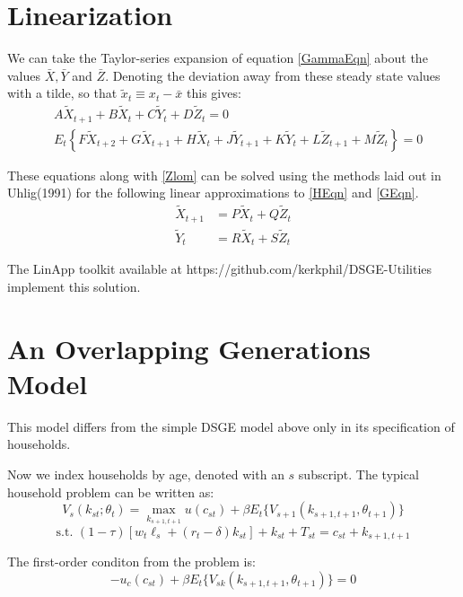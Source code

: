 \documentclass[letterpaper,12pt]{article}
\theoremstyle{definition}
\begin{document}
\begin{spacing}{1.5}
\section{Linearization}
	We can take the Taylor-series expansion of equation \eqref{GammaEqn} about the values $\bar X, \bar Y$ and $\bar Z$.  Denoting the deviation away from these steady state values with a tilde, so that $\tilde x_t \equiv x_t - \bar x$ this gives:
	\begin{align}
		& A \tilde X_{t+1} + B \tilde X_t + C \tilde Y_t + D \tilde Z_t = 0 \\
		& E_t\left\{ F \tilde X_{t+2} + G \tilde X_{t+1} + H \tilde X_{t} + J \tilde Y_{t+1} + K \tilde Y_{t} + L \tilde Z_{t+1} + M \tilde Z_{t} \right\} = 0
	\end{align}

	These equations along with \eqref{Zlom} can be solved using the methods laid out in Uhlig(1991) for the following linear approximations to \eqref{HEqn} and \eqref{GEqn}.
	\begin{align}
		\tilde X_{t+1} & = P \tilde X_{t} + Q \tilde Z_{t} \\
		\tilde Y_{t} & = R \tilde X_{t} + S \tilde Z_{t}
	\end{align}

	The LinApp toolkit available at https://github.com/kerkphil/DSGE-Utilities implement this solution.



\section{An Overlapping Generations Model}
	This model differs from the simple DSGE model above only in its specification of households.

	Now we index households by age, denoted with an $s$ subscript.  The typical household problem can be written as:
	\begin{equation}\label{VFHouseholdSpecOLG}
		 V_s(k_{st};\theta_t) = \max_{k_{s+1,t+1}} u(c_{st}) + \beta E_t\{V_{s+1}(k_{s+1,t+1},\theta_{t+1})\}
		\end{equation}
		\begin{equation}\label{BCHouseholdSpecOLG}
		\text{s.t. } (1-\tau) \left[w_t\ell_{s}+(r_t-\delta)k_{st}\right] + k_{st} + T_{st} = c_{st}+k_{s+1,t+1}
	\end{equation}

	The first-order conditon from the problem is:
		\begin{equation}\label{FOC2HouseholdSpecOLG}
		 -u_c(c_{st}) + \beta E_t\{V_{sk}(k_{s+1,t+1},\theta_{t+1})\} = 0
		\end{equation}


\end{spacing}
\end{document}
